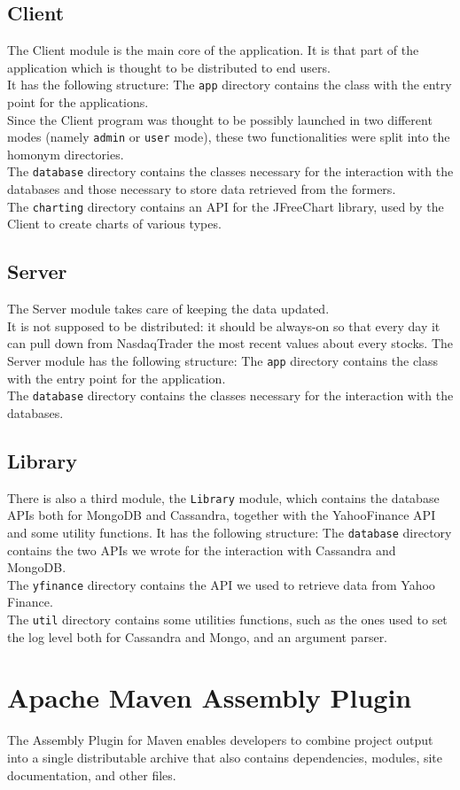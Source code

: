 \subsection{Client}
The Client module is the main core of the application. It is that part of the application which is thought to be distributed to end users.\\
It has the following structure:
\pagebreak
{}
\hfill \break
\noindent The \texttt{app} directory contains the class with the entry point for the applications.\\
Since the Client program was thought to be possibly launched in two different modes (namely \texttt{admin} or \texttt{user} mode), these two functionalities were split into the homonym directories.\\
The \texttt{database} directory contains the classes necessary for the interaction with the databases and those necessary to store data retrieved from the formers.\\
The \texttt{charting} directory contains an API for the JFreeChart library, used by the Client to create charts of various types.

\subsection{Server}
The Server module takes care of keeping the data updated.\\
It is not supposed to be distributed: it should be always-on so that every day it can pull down from  NasdaqTrader the most recent values about every stocks.
The Server module has the following structure:
\hfill \break
\noindent The \texttt{app} directory contains the class with the entry point for the application.\\
The \texttt{database} directory contains the classes necessary for the interaction with the databases.

\subsection{Library}
There is also a third module, the \texttt{Library} module, which contains the database APIs both for MongoDB and Cassandra, together with the YahooFinance API and some utility functions.
It has the following structure:
\pagebreak
{}
\hfill \break
The \texttt{database} directory contains the two APIs we wrote for the interaction with Cassandra and MongoDB.\\
The \texttt{yfinance} directory contains the API we used to retrieve data from Yahoo Finance.\\
The \texttt{util} directory contains some utilities functions, such as the ones used to set the log level both for Cassandra and Mongo, and an argument parser.

\section{Apache Maven Assembly Plugin}
The Assembly Plugin for Maven enables developers to combine project output into 
a single distributable archive that also contains dependencies, modules, site 
documentation, and other files.
